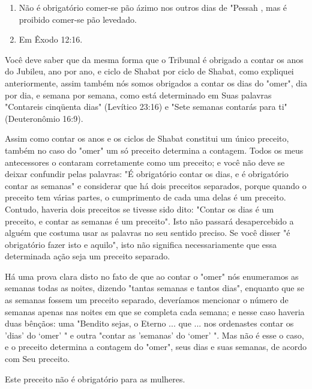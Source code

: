 \begin{itemize}
\begin{enumrate}
\begin{itemize}
\begin{itemize}
\begin{itemize}
\begin{enumerate}
\def\labelenumi{\arabic{enumi}.}
\setcounter{enumi}{182}
\item
 
 Não é obrigatório comer-se pão ázimo nos outros dias de "Pessah , mas
 é proibido comer-se pão levedado.
 
\item
 
 Em Êxodo 12:16.
 
\end{enumerate}




Você deve saber que da mesma forma que o Tribunal é obrigado a contar os
anos do Jubileu, ano por ano, e ciclo de Shabat por ciclo de Shabat,
como expliquei anteriormente, assim também nós somos obrigados a contar
os dias do "omer", dia por dia, e semana por semana, como está
determinado em Suas palavras "Contareis cinqüenta dias" (Levítico 23:16)
e "Sete semanas contarás para ti" (Deuteronômio 16:9).

Assim como contar os anos e os ciclos de Shabat constitui um único
preceito, também no caso do "omer" um só preceito determina a contagem.
Todos os meus antecessores o contaram corretamente como um preceito; e
você não deve se deixar confundir pelas palavras: "É obrigatório contar
os dias, e é obrigatório contar as semanas" e considerar que há dois
preceitos separados, porque quando o preceito tem várias partes, o
cumprimento de cada uma delas é um preceito. Contudo, haveria dois
preceitos se tivesse sido dito: "Contar os dias é um preceito, e contar
as semanas é um preceito". Isto não passará desapercebido a alguém que
costuma usar as palavras no seu sentido preciso. Se você disser "é
obrigatório fazer isto e aquilo", isto não significa necessaria­mente
que essa determinada ação seja um preceito separado.

Há uma prova clara disto no fato de que ao contar o "omer" nós
enumeramos as semanas todas as noites, dizendo "tantas semanas e tantos
dias", enquanto que se as semanas fossem um preceito separado,
deveríamos men­cionar o número de semanas apenas nas noites em que se
completa cada sema­na; e nesse caso haveria duas bênçãos: uma "Bendito
sejas, o Eterno ... que ... nos ordenastes contar os 'dias' do `omer' "
e outra "contar as 'semanas' do `omer' ". Mas não é esse o caso, e o
preceito determina a contagem do "omer", seus dias e suas semanas, de
acordo com Seu preceito.

Este preceito não é obrigatório para as mulheres.


\end{itemize}
\end{itemize}
\end{itemize}
\end{enumrate}
\end{itemize}
